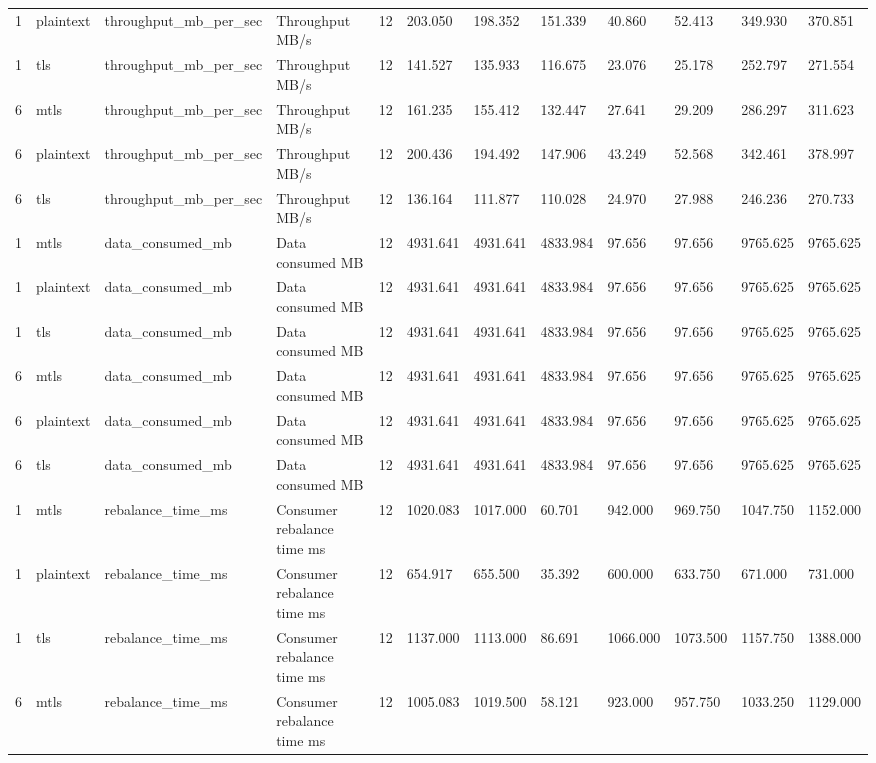 \begin{longtable}{llllllllllll}
1 & plaintext & throughput\_mb\_per\_sec & Throughput MB/s & 12 & 203.050 & 198.352 & 151.339 & 40.860 & 52.413 & 349.930 & 370.851 \\
1 & tls & throughput\_mb\_per\_sec & Throughput MB/s & 12 & 141.527 & 135.933 & 116.675 & 23.076 & 25.178 & 252.797 & 271.554 \\
6 & mtls & throughput\_mb\_per\_sec & Throughput MB/s & 12 & 161.235 & 155.412 & 132.447 & 27.641 & 29.209 & 286.297 & 311.623 \\
6 & plaintext & throughput\_mb\_per\_sec & Throughput MB/s & 12 & 200.436 & 194.492 & 147.906 & 43.249 & 52.568 & 342.461 & 378.997 \\
6 & tls & throughput\_mb\_per\_sec & Throughput MB/s & 12 & 136.164 & 111.877 & 110.028 & 24.970 & 27.988 & 246.236 & 270.733 \\
1 & mtls & data\_consumed\_mb & Data consumed MB & 12 & 4931.641 & 4931.641 & 4833.984 & 97.656 & 97.656 & 9765.625 & 9765.625 \\
1 & plaintext & data\_consumed\_mb & Data consumed MB & 12 & 4931.641 & 4931.641 & 4833.984 & 97.656 & 97.656 & 9765.625 & 9765.625 \\
1 & tls & data\_consumed\_mb & Data consumed MB & 12 & 4931.641 & 4931.641 & 4833.984 & 97.656 & 97.656 & 9765.625 & 9765.625 \\
6 & mtls & data\_consumed\_mb & Data consumed MB & 12 & 4931.641 & 4931.641 & 4833.984 & 97.656 & 97.656 & 9765.625 & 9765.625 \\
6 & plaintext & data\_consumed\_mb & Data consumed MB & 12 & 4931.641 & 4931.641 & 4833.984 & 97.656 & 97.656 & 9765.625 & 9765.625 \\
6 & tls & data\_consumed\_mb & Data consumed MB & 12 & 4931.641 & 4931.641 & 4833.984 & 97.656 & 97.656 & 9765.625 & 9765.625 \\
1 & mtls & rebalance\_time\_ms & Consumer rebalance time ms & 12 & 1020.083 & 1017.000 & 60.701 & 942.000 & 969.750 & 1047.750 & 1152.000 \\
1 & plaintext & rebalance\_time\_ms & Consumer rebalance time ms & 12 & 654.917 & 655.500 & 35.392 & 600.000 & 633.750 & 671.000 & 731.000 \\
1 & tls & rebalance\_time\_ms & Consumer rebalance time ms & 12 & 1137.000 & 1113.000 & 86.691 & 1066.000 & 1073.500 & 1157.750 & 1388.000 \\
6 & mtls & rebalance\_time\_ms & Consumer rebalance time ms & 12 & 1005.083 & 1019.500 & 58.121 & 923.000 & 957.750 & 1033.250 & 1129.000 \\

\end{longtable}

